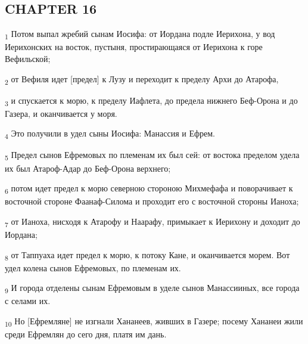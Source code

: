 \subsection{CHAPTER 16}
\begin{tcolorbox}
\textsubscript{1} Потом выпал жребий сынам Иосифа: от Иордана подле Иерихона, у вод Иерихонских на восток, пустыня, простирающаяся от Иерихона к горе Вефильской;
\end{tcolorbox}
\begin{tcolorbox}
\textsubscript{2} от Вефиля идет [предел] к Лузу и переходит к пределу Архи до Атарофа,
\end{tcolorbox}
\begin{tcolorbox}
\textsubscript{3} и спускается к морю, к пределу Иафлета, до предела нижнего Беф-Орона и до Газера, и оканчивается у моря.
\end{tcolorbox}
\begin{tcolorbox}
\textsubscript{4} Это получили в удел сыны Иосифа: Манассия и Ефрем.
\end{tcolorbox}
\begin{tcolorbox}
\textsubscript{5} Предел сынов Ефремовых по племенам их был сей: от востока пределом удела их был Атароф-Адар до Беф-Орона верхнего;
\end{tcolorbox}
\begin{tcolorbox}
\textsubscript{6} потом идет предел к морю северною стороною Михмефафа и поворачивает к восточной стороне Фаанаф-Силома и проходит его с восточной стороны Ианоха;
\end{tcolorbox}
\begin{tcolorbox}
\textsubscript{7} от Ианоха, нисходя к Атарофу и Наарафу, примыкает к Иерихону и доходит до Иордана;
\end{tcolorbox}
\begin{tcolorbox}
\textsubscript{8} от Таппуаха идет предел к морю, к потоку Кане, и оканчивается морем. Вот удел колена сынов Ефремовых, по племенам их.
\end{tcolorbox}
\begin{tcolorbox}
\textsubscript{9} И города отделены сынам Ефремовым в уделе сынов Манассииных, все города с селами их.
\end{tcolorbox}
\begin{tcolorbox}
\textsubscript{10} Но [Ефремляне] не изгнали Хананеев, живших в Газере; посему Хананеи жили среди Ефремлян до сего дня, платя им дань.
\end{tcolorbox}
